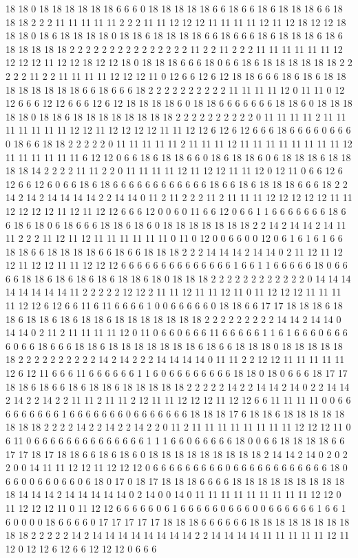 18 18 0 18 18 18 18 18 18 6 6 6 0 18 18 18 18 18 6 6 18 6 6 18 6 18 18 18 6 6 18 18 18 2 2 2 11 11 11 11 11 2 2 2 11 11 12 12 12 11 11 11 11 12 11 12 18 12 12 18 18 18 0 18 6 18 18 18 18 0 18 18 6 18 18 18 18 6 6 18 6 6 6 18 6 18 18 18 6 18 6 18 18 18 18 18 2 2 2 2 2 2 2 2 2 2 2 2 2 2 2 11 2 2 11 2 2 2 11 11 11 11 11 11 12 12 12 12 11 12 12 18 12 12 18 0 18 18 18 6 6 6 18 0 6 6 18 6 18 18 18 18 18 18 2 2 2 2 2 11 2 2 11 11 11 11 12 12 12 11 0 12 6 6 12 6 12 18 18 6 6 6 18 6 18 6 18 18 18 18 18 18 18 18 6 6 18 6 6 6 18 2 2 2 2 2 2 2 2 2 2 11 11 11 11 12 0 11 11 0 12 12 6 6 6 12 12 6 6 6 12 6 12 18 18 18 18 6 0 18 18 6 6 6 6 6 6 6 18 18 6 0 18 18 18 18 18 0 18 18 6 18 18 18 18 18 18 18 18 2 2 2 2 2 2 2 2 2 2 0 11 11 11 11 2 11 11 11 11 11 11 11 12 12 11 12 12 12 12 11 11 12 12 6 12 6 12 6 6 6 18 6 6 6 6 0 6 6 6 0 18 6 6 18 18 2 2 2 2 2 0 11 11 11 11 11 2 11 11 11 12 11 11 11 11 11 11 11 11 12 11 11 11 11 11 11 6 12 12 0 6 6 18 6 18 18 6 6 0 18 6 18 18 6 0 6 18 18 18 6 18 18 18 18 14 2 2 2 2 11 11 2 2 0 11 11 11 11 12 11 12 12 11 11 12 0 12 11 0 6 6 12 6 12 6 6 12 6 0 6 6 18 6 18 6 6 6 6 6 6 6 6 6 6 6 6 18 6 6 18 6 18 18 18 6 6 6 18 2 2 14 2 14 2 14 14 14 14 2 2 14 14 0 11 2 11 2 2 2 11 2 11 11 11 12 12 12 12 12 11 11 12 12 12 12 11 12 11 12 12 6 6 6 12 0 0 6 0 11 6 6 12 0 6 6 1 1 6 6 6 6 6 6 6 18 6 6 18 6 18 0 6 18 6 6 6 18 18 6 18 6 0 18 18 18 18 18 18 18 2 2 14 2 14 14 2 14 11 11 2 2 2 11 12 11 12 11 11 11 11 11 11 0 11 0 12 0 0 6 6 0 0 12 0 6 1 6 1 6 1 6 6 18 18 6 6 18 18 18 18 6 6 18 6 6 18 18 18 2 2 2 14 14 14 2 14 14 0 2 11 12 11 12 12 11 12 12 11 11 12 12 12 6 6 6 6 6 6 6 6 6 6 6 6 6 6 1 6 6 1 1 6 6 6 6 6 18 0 6 6 6 6 18 18 6 18 6 18 6 18 6 18 18 6 18 0 18 18 18 2 2 2 2 2 2 2 2 2 2 2 2 0 14 14 14 14 14 14 14 14 11 2 2 2 2 2 12 12 2 11 11 12 11 11 12 11 0 11 12 12 12 11 11 11 11 12 12 6 12 6 6 11 6 11 6 6 6 6 1 0 0 6 6 6 6 6 0 18 18 6 6 17 17 18 18 18 6 18 18 6 18 18 6 18 6 18 18 6 18 18 18 18 18 18 18 2 2 2 2 2 2 2 2 2 14 14 2 14 14 0 14 14 0 2 11 2 11 11 11 11 12 0 11 0 6 6 0 6 6 6 11 6 6 6 6 6 1 1 6 1 6 6 6 0 6 6 6 6 0 6 6 18 6 6 6 18 18 6 18 18 18 18 18 18 18 6 18 6 6 18 18 18 0 18 18 18 18 18 18 2 2 2 2 2 2 2 2 2 2 14 2 14 2 2 2 14 14 14 14 0 11 11 2 2 12 12 11 11 11 11 11 12 6 12 11 6 6 6 11 6 6 6 6 6 6 1 1 6 0 6 6 6 6 6 6 6 6 18 18 0 18 0 6 6 6 18 17 17 18 18 6 18 6 6 18 6 18 18 6 18 18 18 18 18 2 2 2 2 2 14 2 2 14 14 2 14 0 2 2 14 14 2 14 2 2 14 2 2 11 11 2 11 11 2 12 11 11 12 12 12 11 12 12 6 6 11 11 11 11 0 0 6 6 6 6 6 6 6 6 6 1 6 6 6 6 6 6 6 0 6 6 6 6 6 6 6 18 18 18 17 6 18 18 6 18 18 18 18 18 18 18 18 2 2 2 2 14 2 2 14 2 2 14 2 2 0 11 2 11 11 11 11 11 11 11 11 12 12 12 11 0 6 11 0 6 6 6 6 6 6 6 6 6 6 6 6 6 6 1 1 1 6 6 0 6 6 6 6 6 18 0 0 6 6 18 18 18 18 6 6 17 17 18 17 18 18 6 6 18 6 18 6 0 18 18 18 18 18 18 18 18 18 2 14 14 2 14 0 2 0 2 2 0 0 14 11 11 12 12 11 12 12 12 0 6 6 6 6 6 6 6 6 6 0 6 6 6 6 6 6 6 6 6 6 6 6 18 0 6 6 0 0 6 6 0 6 6 0 6 18 0 17 0 18 17 18 18 18 6 6 6 6 18 18 18 18 18 18 18 18 18 18 14 14 14 2 14 14 14 14 14 0 2 14 0 0 14 0 11 11 11 11 11 11 11 11 11 12 12 0 11 12 12 12 11 0 11 12 12 6 6 6 6 6 0 6 1 6 6 6 6 6 0 6 6 6 0 0 6 6 6 6 6 6 1 6 6 1 6 0 0 0 0 18 6 6 6 6 0 17 17 17 17 17 18 18 18 6 6 6 6 6 6 18 18 18 18 18 18 18 18 18 18 2 2 2 2 2 14 2 14 14 14 14 14 14 14 14 2 2 14 14 14 14 11 11 11 11 11 12 11 12 0 12 12 6 12 6 6 12 12 12 0 6 6 6 